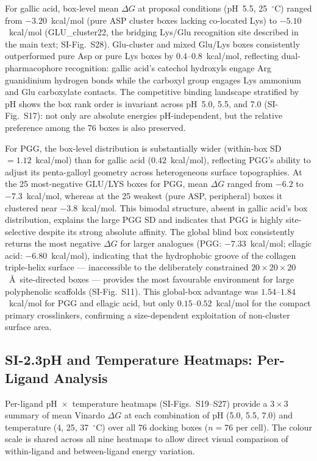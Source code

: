 \documentclass[11pt]{article}
\begin{document}
For gallic acid, box-level mean $\Delta G$ at proposal conditions
(pH~5.5, 25~$^\circ$C) ranged from $-3.20$~kcal/mol (pure ASP cluster boxes
lacking co-located Lys) to $-5.10$~kcal/mol (GLU\_cluster22, the bridging
Lys/Glu recognition site described in the main text; SI-Fig.~S28).
Glu-cluster and mixed Glu/Lys boxes consistently outperformed pure Asp or
pure Lys boxes by $0.4$--$0.8$~kcal/mol, reflecting dual-pharmacophore
recognition: gallic acid's catechol hydroxyls engage Arg guanidinium hydrogen
bonds while the carboxyl group engages Lys ammonium and Glu carboxylate contacts.
The competitive binding landscape stratified by pH shows the box rank order
is invariant across pH~5.0, 5.5, and 7.0 (SI-Fig.~S17): not only are absolute
energies pH-independent, but the relative preference among the 76 boxes is also
preserved.

For PGG, the box-level distribution is substantially wider (within-box
SD~$= 1.12$~kcal/mol) than for gallic acid ($0.42$~kcal/mol), reflecting PGG's
ability to adjust its penta-galloyl geometry across heterogeneous surface
topographies.
At the 25 most-negative GLU/LYS boxes for PGG, mean $\Delta G$ ranged from
$-6.2$ to $-7.3$~kcal/mol, whereas at the 25 weakest (pure ASP, peripheral)
boxes it clustered near $-3.8$~kcal/mol.
This bimodal structure, absent in gallic acid's box distribution, explains the
large PGG SD and indicates that PGG is highly site-selective despite its strong
absolute affinity.
The global blind box consistently returns the most negative $\Delta G$ for
larger analogues (PGG: $-7.33$~kcal/mol; ellagic acid: $-6.80$~kcal/mol),
indicating that the hydrophobic groove of the collagen triple-helix surface ---
inaccessible to the deliberately constrained $20 \times 20 \times 20$~\AA\
site-directed boxes --- provides the most favourable environment for large
polyphenolic scaffolds (SI-Fig.~S11).
This global-box advantage was $1.54$--$1.84$~kcal/mol for PGG and ellagic acid,
but only $0.15$--$0.52$~kcal/mol for the compact primary crosslinkers,
confirming a size-dependent exploitation of non-cluster surface area.

\subsection*{SI-2.3\quad pH and Temperature Heatmaps: Per-Ligand Analysis}

Per-ligand pH~$\times$~temperature heatmaps (SI-Figs.~S19--S27) provide a
$3 \times 3$ summary of mean Vinardo $\Delta G$ at each combination of
pH (5.0, 5.5, 7.0) and temperature (4, 25, 37~$^\circ$C) over all 76 docking
boxes ($n = 76$ per cell).
The colour scale is shared across all nine heatmaps to allow direct visual
comparison of within-ligand and between-ligand energy variation.
\end{document}
